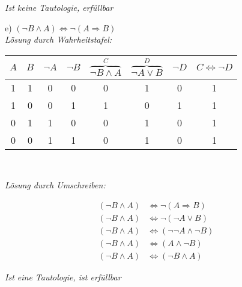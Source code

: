 \textit{Ist keine Tautologie, erfüllbar}\\

\newpage

e) $(\lnot B \land A) \Leftrightarrow \lnot (A \Rightarrow B)$\\

\textit{Lösung durch Wahrheitstafel:}

\begin{table}[h]
\centering
\begin{tabular}{c|c|c|c|c|c|c|c}
$A$ & $B$ & $\lnot A$ & $\lnot B$ & $\overbrace{\lnot B \land A}^{C}$ & $\overbrace{\lnot A \lor B}^{D}$ & $\lnot D$ & $C \Leftrightarrow \lnot D$\\
\hline
1 & 1 & 0 & 0 & 0 & 1 & 0 & 1\\
1 & 0 & 0 & 1 & 1 & 0 & 1 & 1\\
0 & 1 & 1 & 0 & 0 & 1 & 0 & 1\\
0 & 0 & 1 & 1 & 0 & 1 & 0 & 1\\
\end{tabular}
\end{table}\

\textit{Lösung durch Umschreiben:}

\begin{align*}
(\lnot B \land A) &\Leftrightarrow \lnot (A \Rightarrow B)\\
(\lnot B \land A) &\Leftrightarrow \lnot (\lnot A \lor B)\\
(\lnot B \land A) &\Leftrightarrow (\lnot \lnot A \land \lnot B)\\
(\lnot B \land A) &\Leftrightarrow (A \land \lnot B)\\
(\lnot B \land A) &\Leftrightarrow (\lnot B \land A) 
\end{align*}


\textit{Ist eine Tautologie, ist erfüllbar}